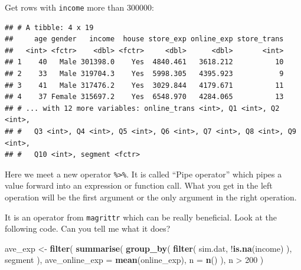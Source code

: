\documentclass[]{book}
\newenvironment{Shaded}{\begin{snugshade}}{\end{snugshade}}
\newcommand{\KeywordTok}[1]{\textcolor[rgb]{0.13,0.29,0.53}{\textbf{{#1}}}}
\newcommand{\DataTypeTok}[1]{\textcolor[rgb]{0.13,0.29,0.53}{{#1}}}
\newcommand{\DecValTok}[1]{\textcolor[rgb]{0.00,0.00,0.81}{{#1}}}
\newcommand{\StringTok}[1]{\textcolor[rgb]{0.31,0.60,0.02}{{#1}}}
\newcommand{\NormalTok}[1]{{#1}}
\theoremstyle{definition}
\theoremstyle{definition}
\theoremstyle{remark}
\begin{document}
Get rows with \texttt{income} more than 300000:

\begin{Shaded}
\end{Shaded}

\begin{verbatim}
## # A tibble: 4 x 19
##     age gender   income  house store_exp online_exp store_trans
##   <int> <fctr>    <dbl> <fctr>     <dbl>      <dbl>       <int>
## 1    40   Male 301398.0    Yes  4840.461   3618.212          10
## 2    33   Male 319704.3    Yes  5998.305   4395.923           9
## 3    41   Male 317476.2    Yes  3029.844   4179.671          11
## 4    37 Female 315697.2    Yes  6548.970   4284.065          13
## # ... with 12 more variables: online_trans <int>, Q1 <int>, Q2 <int>,
## #   Q3 <int>, Q4 <int>, Q5 <int>, Q6 <int>, Q7 <int>, Q8 <int>, Q9 <int>,
## #   Q10 <int>, segment <fctr>
\end{verbatim}

Here we meet a new operator \texttt{\%\textgreater{}\%}. It is called
``Pipe operator'' which pipes a value forward into an expression or
function call. What you get in the left operation will be the first
argument or the only argument in the right operation.

\begin{Shaded}
\end{Shaded}

It is an operator from \texttt{magrittr} which can be really beneficial.
Look at the following code. Can you tell me what it does?

\begin{Shaded}
\begin{Highlighting}[]
\NormalTok{ave_exp <-}\StringTok{ }\KeywordTok{filter}\NormalTok{( }
  \KeywordTok{summarise}\NormalTok{(}
    \KeywordTok{group_by}\NormalTok{( }
      \KeywordTok{filter}\NormalTok{(}
        \NormalTok{sim.dat, }
        \NormalTok{!}\KeywordTok{is.na}\NormalTok{(income)}
      \NormalTok{), }
      \NormalTok{segment}
    \NormalTok{), }
    \DataTypeTok{ave_online_exp =} \KeywordTok{mean}\NormalTok{(online_exp), }
    \DataTypeTok{n =} \KeywordTok{n}\NormalTok{()}
  \NormalTok{), }
  \NormalTok{n >}\StringTok{ }\DecValTok{200}
\NormalTok{) }
\end{Highlighting}
\end{Shaded}
\end{document}
